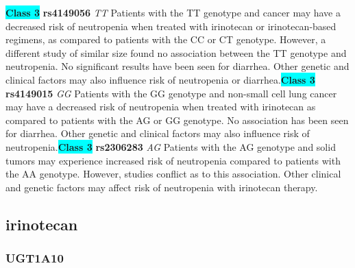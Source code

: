 \documentclass{book}
\begin{document}
\begin{center}
\textbf{\colorbox{cyan} {Class 3}} \textbf{ rs4149056 } \textit{ TT }
Patients with the TT genotype and cancer may have a decreased risk of neutropenia when treated with irinotecan or irinotecan-based regimens, as compared to patients with the CC or CT genotype. However, a different study of similar size found no association between the TT genotype and neutropenia. No significant results have been seen for diarrhea. Other genetic and clinical factors may also influence risk of neutropenia or diarrhea.\textbf{\colorbox{cyan} {Class 3}} \textbf{ rs4149015 } \textit{ GG }
Patients with the GG genotype and non-small cell lung cancer may have a decreased risk of neutropenia when treated with irinotecan as compared to patients with the AG or GG genotype. No association has been seen for diarrhea. Other genetic and clinical factors may also influence risk of neutropenia.\textbf{\colorbox{cyan} {Class 3}} \textbf{ rs2306283 } \textit{ AG }
Patients with the AG genotype and solid tumors may experience increased risk of neutropenia compared to patients with the AA genotype. However, studies conflict as to this association. Other clinical and genetic factors may affect risk of neutropenia with irinotecan therapy.


\end{center}\subsection{ irinotecan }


\subsubsection{ UGT1A10 }
\end{document}
